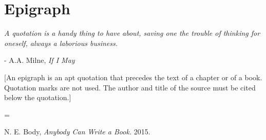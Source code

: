 \documentclass{ucalgarythesis}
\theoremstyle{plain}
\theoremstyle{definition}
\begin{document}
  \chapter{Epigraph}

  \begin{epiquote} 
   \textit{A quotation is a handy thing to have about, saving one the trouble of thinking for oneself, always a laborious business.} 
  \end{epiquote}    
  \begin{flushright} - A.A. Milne, \textit{If I May}\end{flushright}\bigskip
   
  [An epigraph is an apt quotation that precedes the text of a chapter or of a book. Quotation marks are not used. The author and title of the source must be cited below the quotation.]



  \mainmatter           %
    
  
    



  =

  \begin{thebibliography}{9}

     N. E. Body, {\em Anybody Can Write a Book.}  2015.
    
  \end{thebibliography}
   
\end{document}
